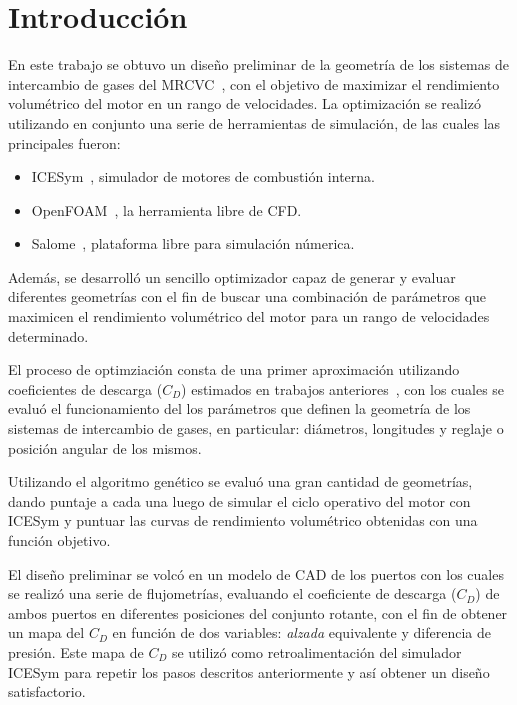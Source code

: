 \chapter{Introducción}

En este trabajo se obtuvo un diseño preliminar de la geometría de los  sistemas
de intercambio de gases del MRCVC~\cite{toth}, con el objetivo de maximizar el
rendimiento volumétrico del motor en un rango de velocidades.
%
La optimización se realizó utilizando en conjunto una serie de herramientas de
simulación, de las cuales las principales fueron: 

\begin{itemize}
    \item ICESym~\cite{icesym}, simulador de motores de combustión interna.
    \item OpenFOAM~\cite{openfoam}, la herramienta libre de CFD.
    \item Salome~\cite{salome}, plataforma libre para simulación númerica.
\end{itemize}


Además, se desarrolló un sencillo optimizador capaz de generar y evaluar
diferentes geometrías con el fin de buscar una combinación de parámetros que
maximicen el rendimiento volumétrico del motor para un rango de velocidades
determinado.


El proceso de optimziación consta de una primer aproximación utilizando
coeficientes de descarga ($C_{D}$) estimados en trabajos
anteriores~\cite{lopez13}, con los cuales se evaluó el funcionamiento del los
parámetros que definen la geometría de los sistemas de intercambio de gases, en
particular: diámetros, longitudes y reglaje o posición angular de los mismos.

Utilizando el algoritmo genético se evaluó una gran cantidad de geometrías,
dando puntaje a cada una luego de simular el ciclo operativo del motor con
ICESym y puntuar las curvas de rendimiento volumétrico obtenidas con una
función objetivo.

El diseño preliminar se volcó en un modelo de CAD de los puertos con los cuales
se realizó una serie de flujometrías, evaluando el coeficiente de descarga
($C_D$) de ambos puertos en diferentes posiciones del conjunto rotante, con el
fin de obtener un mapa del $C_D$ en función de dos variables: \emph{alzada}
equivalente y diferencia de presión.
%
Este mapa de $C_{D}$ se utilizó como retroalimentación del simulador ICESym
para repetir los pasos descritos anteriormente y así obtener un diseño
satisfactorio.

